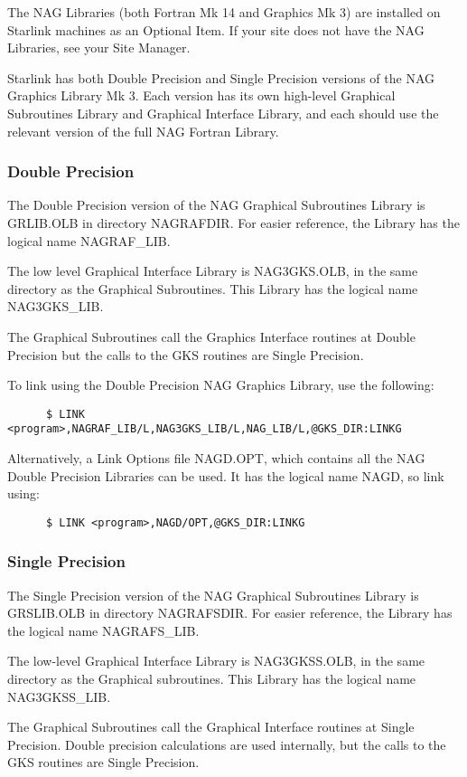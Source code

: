 The NAG Libraries (both Fortran Mk 14 and Graphics Mk 3) are installed on
Starlink machines as an Optional Item. If your site does not have the NAG
Libraries, see your Site Manager.

Starlink has both Double Precision and Single Precision versions of the
NAG Graphics Library Mk 3. Each version has its own high-level Graphical
Subroutines Library and  Graphical Interface Library, and each should use the
relevant version of the full NAG Fortran Library.

\subsubsection{Double Precision}

The Double Precision version of the NAG Graphical Subroutines Library is
GRLIB.OLB in directory NAGRAFDIR. For easier reference, the Library has the
logical name NAGRAF\_LIB.

The low level Graphical Interface Library is NAG3GKS.OLB, in the same directory
as the Graphical Subroutines. This Library has the logical name NAG3GKS\_LIB.

The Graphical Subroutines call the Graphics Interface routines at Double
Precision but the calls to the GKS routines are Single Precision.

To link using the Double Precision NAG Graphics Library, use the following:
\begin{verbatim}
      $ LINK <program>,NAGRAF_LIB/L,NAG3GKS_LIB/L,NAG_LIB/L,@GKS_DIR:LINKG
\end{verbatim}
Alternatively, a Link Options file NAGD.OPT, which contains all the NAG Double
Precision Libraries can be used. It has the logical name NAGD, so link using:
\begin{verbatim}
      $ LINK <program>,NAGD/OPT,@GKS_DIR:LINKG
\end{verbatim}

\subsubsection{Single Precision}
The Single Precision version of the NAG Graphical Subroutines Library is
GRSLIB.OLB in directory NAGRAFSDIR. For easier reference, the Library has the
logical name NAGRAFS\_LIB.

The low-level Graphical Interface Library is NAG3GKSS.OLB, in the same directory
as the Graphical subroutines. This Library has the logical name NAG3GKSS\_LIB.

The Graphical Subroutines call the Graphical Interface routines at Single
Precision. Double precision calculations are used internally, but the calls to
the GKS routines are Single Precision.


